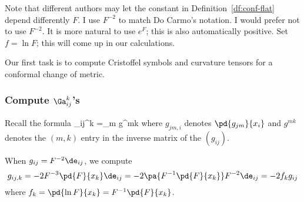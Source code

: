 Note that different authors may let the constant in Definition~\ref{df:conf-flat} depend differently $F$. I use $F^{-2}$ to match Do Carmo's notation. I would prefer not to use $F^{-2}$. It is more natural to use $e^F$; this is also automatically positive. Set $f=\ln F$; this will come up in our calculations.



Our first task is to compute Cristoffel symbols and curvature tensors for a conformal change of metric.

\subsubsection{Compute $\Ga_{ij}^k$'s}
Recall the formula
\Ga_{ij}^k =\sum_m  g^{mk}
\eeq
where $g_{jm,i}$ denotes $\pd{g_{jm}}{x_i}$ and $g^{mk}$ denotes the $(m,k)$ entry in the inverse matrix of the $(g_{ij})$. 

When $g_{ij}=F^{-2}\de_{ij}$, we compute  %
\[
g_{ij,k} =-2F^{-3} \pd{F}{x_k} \de_{ij} =
-2\pa{F^{-1}\pd{F}{x_k}}F^{-2}\de_{ij}
= -2f_{k} g_{ij} 
\]
where $f_k=\pd{\ln F}{x_k}=F^{-1}\pd{F}{x_k}$. %

